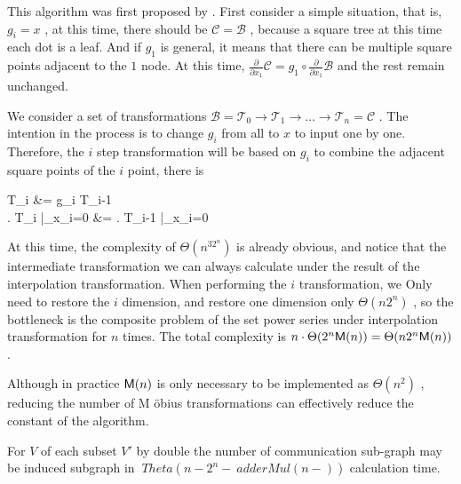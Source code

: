 This algorithm was first proposed by \cite { b2c }. First consider a simple situation, that is, $ g_i = x $ , at this time, there should be $ \mathscr C = \mathscr B $ , because a square tree at this time each dot is a leaf. And if $ g_ 1 $ is general, it means that there can be multiple square points adjacent to the $ 1 $ node. At this time, $ \frac { \partial }{ \partial x_1} \mathscr C = g_ 1  \circ  \frac { \partial }{ \partial x_1} \mathscr B $ and the rest remain unchanged.

We consider a set of transformations $ \mathscr B = \mathscr T_ 0  \rightarrow  \mathscr T_ 1 \rightarrow  \dots  \rightarrow  \mathscr T_n = \mathscr C $ . The intention in the process is to change $ g_i $ from all to $ x $ to input one by one. Therefore, the $ i $ step transformation will be based on $ g_i $ to combine the adjacent square points of the $ i $ point, there is
\begin { align* }
 \mathscr T_{i} &= g_i \circ  {} \mathscr T_{i-1} \\
\left . \mathscr T_i \right |_{x_i=0} &= \left . \mathscr T_{i-1} \right |_{x_i=0}
\end { align* }
At this time, the complexity of $ \Theta (n^ 32 ^n) $ is already obvious, and notice that the intermediate transformation we can always calculate under the result of the interpolation transformation. When performing the $ i $ transformation, we Only need to restore the $ i $ dimension, and restore one dimension only $ \Theta (n 2 ^n) $ , so the bottleneck is the composite problem of the set power series under interpolation transformation for $ n $ times. The total complexity is $ n \cdot  \Theta ( 2 ^n  \mathsf M (n)) = \Theta (n 2 ^n  \mathsf M (n)) $ .

Although in practice $  \mathsf M (n) $ is only necessary to be implemented as $ \Theta (n^ 2 ) $ , reducing the number of M \" obius transformations can effectively reduce the constant of the algorithm.

\begin { lemma }
For $ V $ of each subset $ V ' $ by double the number of communication sub-graph may be induced subgraph in $ \ Theta (n- 2 ^ n- \ adder Mul (n-)) $ calculation time.
\end { lemma }

